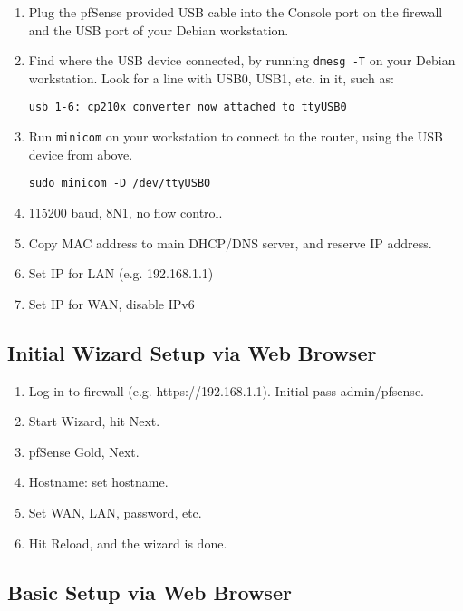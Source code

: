 \begin{enumerate}
 \item Plug the pfSense provided USB cable into the Console port on the firewall and the USB port of your Debian workstation.
 \item Find where the USB device connected, by running \texttt{dmesg -T} on your Debian workstation.
Look for a line with USB0, USB1, etc. in it, such as:
\begin{verbatim}
usb 1-6: cp210x converter now attached to ttyUSB0
\end{verbatim}
 \item Run \texttt{minicom} on your workstation to connect to the router, using the USB device from above.
\begin{verbatim}
sudo minicom -D /dev/ttyUSB0
\end{verbatim}



 \item 115200 baud, 8N1, no flow control.
 \item Copy MAC address to main DHCP/DNS server, and reserve IP address.
 \item Set IP for LAN (e.g. 192.168.1.1)
 \item Set IP for WAN, disable IPv6
\end{enumerate}

\subsection{Initial Wizard Setup via Web Browser}

\begin{enumerate}
 \item Log in to firewall (e.g. https://192.168.1.1).
       Initial pass admin/pfsense.
 \item Start Wizard, hit Next.
 \item pfSense Gold, Next.
 \item Hostname: set hostname.
 \item Set WAN, LAN, password, etc.
 \item Hit Reload, and the wizard is done.
\end{enumerate}

\subsection{Basic Setup via Web Browser}

